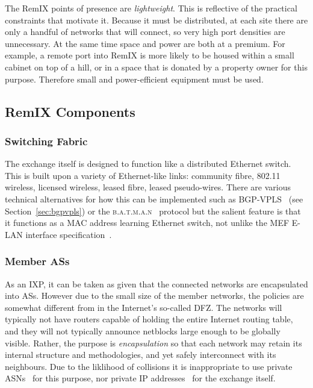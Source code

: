 The RemIX points of presence are \emph{lightweight}. This is
reflective of the practical constraints that motivate it. Because it
must be distributed, at each site there are only a handful of networks
that will connect, so very high port densities are unnecessary. At the
same time space and power are both at a premium. For example, a remote
port into RemIX is more likely to be housed within a small cabinet on
top of a hill, or in a space that is donated by a property owner for
this purpose. Therefore small and power-efficient equipment must be
used.

\subsection{RemIX Components}

\subsubsection{Switching Fabric}
The exchange itself is designed to function like a distributed
Ethernet switch. This is built upon a variety of
Ethernet-like links: community fibre, 802.11 wireless, licensed
wireless, leased fibre, leased pseudo-wires.  There are various
technical alternatives for how this can be implemented such as
BGP-VPLS~\cite{rfc4761} (see Section~\ref{sec:bgpvpls}) or the
\textsc{b.a.t.m.a.n}~\cite{johnson2008simple}
protocol but the salient feature is that it functions as a MAC address
learning Ethernet switch, not unlike the \ac{MEF} E-LAN interface
specification~\cite{mef62,mefes}.

\subsubsection{Member \acp{AS}}
As an \ac{IXP}, it can be taken as given that the connected networks
are encapsulated into \acp{AS}. However due to the small size of the
member networks, the policies are somewhat different from in the
Internet's so-called \ac{DFZ}. The networks will typically not have
routers capable of holding the entire Internet routing table, and they
will not typically announce netblocks large enough to be globally
visible. Rather, the purpose is \emph{encapsulation} so that each
network may retain its internal structure and methodologies, and yet
safely interconnect with its neighbours. Due to the
liklihood of collisions it is inappropriate to use private
\acp{ASN}~\cite{rfc6996} for this purpose, nor private IP 
addresses~\cite{rfc1918} for the exchange itself.

